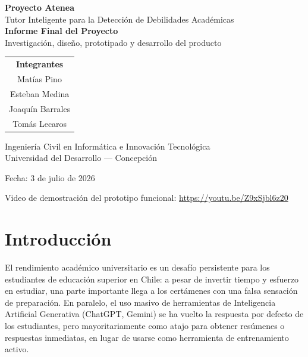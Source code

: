 \documentclass[11pt,a4paper]{article}
\title{\vspace{-2cm}}
\date{}
\begin{document}
\begin{titlepage}
\centering
\vspace*{1.5cm}
{\Huge\bfseries\color{atenea} Proyecto Atenea}\\[0.4cm]
{\Large Tutor Inteligente para la Detecci\'on de Debilidades Acad\'emicas}\\[1.2cm]

{\large\bfseries Informe Final del Proyecto}\\[0.2cm]
{\normalsize Investigaci\'on, dise\~no, prototipado y desarrollo del producto}\\[2cm]

\begin{tabular}{c}
\textbf{Integrantes} \\[0.3cm]
Mat\'ias Pino \\
Esteban Medina \\
Joaqu\'in Barrales \\
Tom\'as Lecaros
\end{tabular}

\vspace{1.5cm}
Ingenier\'ia Civil en Inform\'atica e Innovaci\'on Tecnol\'ogica\\
Universidad del Desarrollo --- Concepci\'on

\vspace{1.5cm}
Fecha: 3 de julio de 2026

\vfill
{\small Video de demostraci\'on del prototipo funcional: \url{https://youtu.be/Z9xSjbl6z20}}
\end{titlepage}

\tableofcontents
\newpage

\section{Introducci\'on}

El rendimiento acad\'emico universitario es un desaf\'io persistente para los estudiantes de educaci\'on superior en Chile: a pesar de invertir tiempo y esfuerzo en estudiar, una parte importante llega a los cert\'amenes con una falsa sensaci\'on de preparaci\'on. En paralelo, el uso masivo de herramientas de Inteligencia Artificial Generativa (ChatGPT, Gemini) se ha vuelto la respuesta por defecto de los estudiantes, pero mayoritariamente como atajo para obtener res\'umenes o respuestas inmediatas, en lugar de usarse como herramienta de entrenamiento activo.
\end{document}
